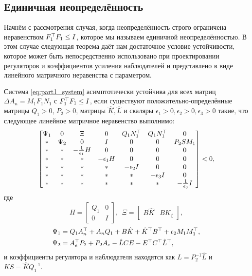 \subsection{Единичная неопределённость}\label{sec:ch4/sect2/sub1}

Начнём с рассмотрения случая, когда неопределённость строго ограничена неравенством ${F}_1^\top{F}_1\leq {I}$, которое мы называем единичной неопределённостью. В этом случае следующая теорема даёт нам достаточное условие устойчивости, которое может быть непосредственно использовано при проектировании регуляторов и коэффициентов усиления наблюдателей и представлено в виде линейного матричного неравенства с параметром.
\begin{theorem}\label{thm:part1_LMI_1}
	Система \eqref{eq:part1_system} асимптотически устойчива для всех матриц $\Delta {A}_n={M}_1{F}_1{N}_1$ с ${F}_1^\top{F}_1\leq {I}$, если существуют положительно-определённые матрицы ${Q}_1>0$, ${P}_2>0$, матрицы $\hat{{K}}, \hat{{L}}$ и скаляры $\epsilon_1>0,\epsilon_2>0,\epsilon_3>0$ такие, что следующее линейное матричное неравенство выполнимо: 
	\begin{equation}
		\label{eq:thm1_main_LMI}
		\begin{bmatrix}    
			{\Psi}_1  & 0 & {\Xi} & 0 &  {Q}_1{N}_1^\top & {Q}_1{N}_1^\top & 0\\
			* & {\Psi}_2 & 0 & {I} & 0 & 0 & {P}_2{S}{M}_1\\
			* & * &  -\frac{1}{\epsilon_1}{H} & 0 & 0 &0 & 0\\
			* & * & * & -\epsilon_1{H} & 0 & 0 & 0 \\
			* & * & * & * & -\epsilon_2 {I} & 0 & 0 \\       * & * & * & * & *& -\epsilon_3 {I} & 0 \\
			* & * & * & * & *& * & -\frac{1}{\epsilon_3} {I}
		\end{bmatrix} <0,
	\end{equation}
	где
	\begin{equation}
		\label{eq:H_Xi_variables}
		{H} = \begin{bmatrix}
			{Q}_1 & 0 \\
			0 & {I}
		\end{bmatrix}, \ \ 
		{\Xi} = \begin{bmatrix}
			{B}\hat{{K}} & {B}{K}_{\zeta} \end{bmatrix},
	\end{equation}
	\begin{align}
		\label{eq:Psi_1}
		{\Psi}_1&={Q}_1{A}_n^\top+{A}_n{Q}_1+{B}\hat{{K}}+\hat{{K}}^\top{B}^\top  +\epsilon_2{M}_1{M}_1^\top, \\
		\label{eq:Psi_2}
		{\Psi}_2 &={A}_e^\top{P}_2+{P}_2{A}_e-\hat{{L}}{CE}-{E}^\top{C}^\top\hat{{L}}^\top,
	\end{align}
	и коэффициенты регулятора и наблюдателя находятся как ${L}={P}^{-1}_2\hat{{L}}$
	и ${KS}=\hat{{K}}{Q}^{-1}_1$.  
\end{theorem}
